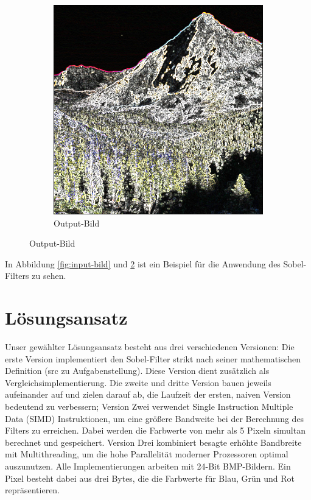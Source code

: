 \documentclass[course=erap]{aspdoc}
\begin{document}
\begin{figure}[H]
\begin{subfigure}{.5\columnwidth}
        \includegraphics[width=\columnwidth]{graphics/johnmuirtrail_sobel.png}
        \caption{Output-Bild}
        \label{fig:output-bild}
    \end{subfigure}
\end{figure}

In Abbildung \ref{fig:input-bild} und \ref{fig:output-bild} ist ein Beispiel für die Anwendung des Sobel-Filters zu sehen.

\section{Lösungsansatz}

Unser gewählter Lösungsansatz besteht aus drei verschiedenen Versionen:
Die erste Version implementiert den Sobel-Filter strikt nach seiner mathematischen Definition (src zu Aufgabenstellung).
Diese Version dient zusätzlich als Vergleichsimplementierung.
Die zweite und dritte Version bauen jeweils aufeinander auf und zielen darauf ab, die Laufzeit der ersten, naiven Version bedeutend zu verbessern;
Version Zwei verwendet Single Instruction Multiple Data (SIMD) Instruktionen, um eine größere Bandweite bei der Berechnung des Filters zu erreichen.
Dabei werden die Farbwerte von mehr als 5 Pixeln simultan berechnet und gespeichert.
Version Drei kombiniert besagte erhöhte Bandbreite mit Multithreading, um die hohe Parallelität moderner Prozessoren optimal auszunutzen.
Alle Implementierungen arbeiten mit 24-Bit BMP-Bildern.
Ein Pixel besteht dabei aus drei Bytes, die die Farbwerte für Blau, Grün und Rot repräsentieren.
\end{document}
